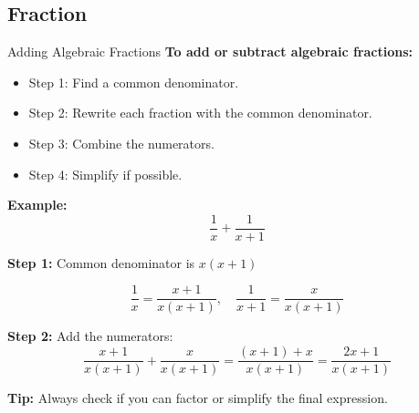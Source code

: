 \documentclass{beamer}
\begin{document}
\begin{frame}
\section{Fraction}
\end{frame}

\begin{frame}{Adding Algebraic Fractions}
\small
\textbf{To add or subtract algebraic fractions:}
\begin{itemize}
    \item Step 1: Find a common denominator.
    \item Step 2: Rewrite each fraction with the common denominator.
    \item Step 3: Combine the numerators.
    \item Step 4: Simplify if possible.
\end{itemize}

\textbf{Example:} 
\[
\frac{1}{x} + \frac{1}{x+1}
\]

\textbf{Step 1:} Common denominator is $x(x+1)$

\[
\frac{1}{x} = \frac{x+1}{x(x+1)}, \quad 
\frac{1}{x+1} = \frac{x}{x(x+1)}
\]

\textbf{Step 2:} Add the numerators:
\[
\frac{x+1}{x(x+1)} + \frac{x}{x(x+1)} = \frac{(x+1) + x}{x(x+1)} = \frac{2x+1}{x(x+1)}
\]

\textbf{Tip:} Always check if you can factor or simplify the final expression.
\end{frame}
\end{document}
